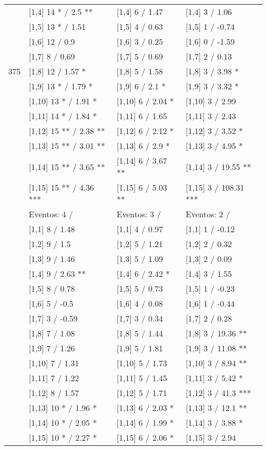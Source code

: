 \begin{table}
\begin{tabular}[t]{llll}
 & {}[1,4] 14 * / 2.5 ** & {}[1,4] 6  / 1.47 & {}[1,4] 3  / 1.06\\
 & {}[1,5] 13 * / 1.51 & {}[1,5] 4  / 0.63 & {}[1,5] 1  / -0.74\\
 & {}[1,6] 12  / 0.9 & {}[1,6] 3  / 0.25 & {}[1,6] 0  / -1.59\\
 & {}[1,7] 8  / 0.69 & {}[1,7] 5  / 0.69 & {}[1,7] 2  / 0.13\\
375 & {}[1,8] 12  / 1.57 * & {}[1,8] 5  / 1.58 & {}[1,8] 3  / 3.98 *\\
\addlinespace
 & {}[1,9] 13 * / 1.79 * & {}[1,9] 6  / 2.1 * & {}[1,9] 3  / 3.32 *\\
 & {}[1,10] 13 * / 1.91 * & {}[1,10] 6  / 2.04 * & {}[1,10] 3  / 2.99\\
 & {}[1,11] 14 * / 1.84 * & {}[1,11] 6  / 1.65 & {}[1,11] 3  / 2.43\\
 & {}[1,12] 15 ** / 2.38 ** & {}[1,12] 6  / 2.12 * & {}[1,12] 3  / 3.52 *\\
 & {}[1,13] 15 ** / 3.01 ** & {}[1,13] 6  / 2.9 * & {}[1,13] 3  / 4.95 *\\
\addlinespace
 & {}[1,14] 15 ** / 3.65 ** & {}[1,14] 6  / 3.67 ** & {}[1,14] 3  / 19.55 **\\
 & {}[1,15] 15 ** / 4.36 *** & {}[1,15] 6  / 5.03 ** & {}[1,15] 3  / 108.31 ***\\
 & Eventos:  4 / & Eventos:  3 / & Eventos:  2 /\\
 & {}[1,1] 8  / 1.48 & {}[1,1] 4  / 0.97 & {}[1,1] 1  / -0.12\\
 & {}[1,2] 9  / 1.5 & {}[1,2] 5  / 1.21 & {}[1,2] 2  / 0.32\\
\addlinespace
 & {}[1,3] 9  / 1.46 & {}[1,3] 5  / 1.09 & {}[1,3] 2  / 0.09\\
 & {}[1,4] 9  / 2.63 ** & {}[1,4] 6  / 2.42 * & {}[1,4] 3  / 1.55\\
 & {}[1,5] 8  / 0.78 & {}[1,5] 5  / 0.73 & {}[1,5] 1  / -0.23\\
 & {}[1,6] 5  / -0.5 & {}[1,6] 4  / 0.08 & {}[1,6] 1  / -0.44\\
 & {}[1,7] 3  / -0.59 & {}[1,7] 3  / 0.34 & {}[1,7] 2  / 0.28\\
\addlinespace
500 & {}[1,8] 7  / 1.08 & {}[1,8] 5  / 1.44 & {}[1,8] 3  / 19.36 **\\
 & {}[1,9] 7  / 1.26 & {}[1,9] 5  / 1.81 & {}[1,9] 3  / 11.08 **\\
 & {}[1,10] 7  / 1.31 & {}[1,10] 5  / 1.73 & {}[1,10] 3  / 8.94 **\\
 & {}[1,11] 7  / 1.22 & {}[1,11] 5  / 1.45 & {}[1,11] 3  / 5.42 *\\
 & {}[1,12] 8  / 1.57 & {}[1,12] 5  / 1.71 & {}[1,12] 3  / 41.3 ***\\
\addlinespace
 & {}[1,13] 10 * / 1.96 * & {}[1,13] 6  / 2.03 * & {}[1,13] 3  / 12.1 **\\
 & {}[1,14] 10 * / 2.05 * & {}[1,14] 6  / 1.99 * & {}[1,14] 3  / 3.88 *\\
 & {}[1,15] 10 * / 2.27 * & {}[1,15] 6  / 2.06 * & {}[1,15] 3  / 2.94\\
\bottomrule
\end{tabular}
\end{table}

